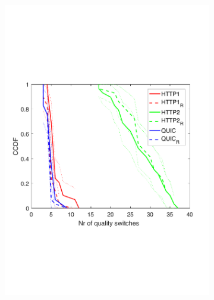 \begin{figure}[htb!]
\begin{subfigure}[t]{0.33\textwidth}
    \includegraphics[trim={0 6cm 0 7cm}, scale=0.25]{figures/CDF_cntswitch_squad_sdn_p1p2_nd18.pdf}
    \caption{}
    \label{fig:sdn_p1_p2cntsw}
  \end{subfigure}
    \begin{subfigure}[t]{0.33\textwidth}
  \captionsetup{justification=centering,margin=1.5cm}

\end{subfigure}
\end{figure}
